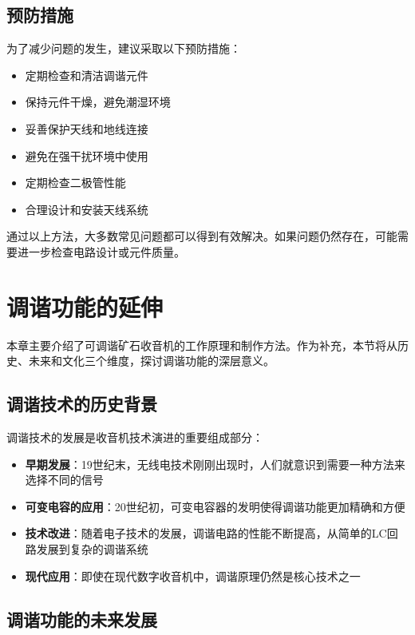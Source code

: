 \documentclass[12pt,UTF8]{ctexbook}
\begin{document}
\subsection{预防措施}

为了减少问题的发生，建议采取以下预防措施：

\begin{itemize}[leftmargin=3.5em]
    \item 定期检查和清洁调谐元件
    \item 保持元件干燥，避免潮湿环境
    \item 妥善保护天线和地线连接
    \item 避免在强干扰环境中使用
    \item 定期检查二极管性能
    \item 合理设计和安装天线系统
\end{itemize}

通过以上方法，大多数常见问题都可以得到有效解决。如果问题仍然存在，可能需要进一步检查电路设计或元件质量。

\section*{调谐功能的延伸}


本章主要介绍了可调谐矿石收音机的工作原理和制作方法。作为补充，本节将从历史、未来和文化三个维度，探讨调谐功能的深层意义。

\subsection{调谐技术的历史背景}

调谐技术的发展是收音机技术演进的重要组成部分：

\begin{itemize}[leftmargin=3.5em]
    \item \textbf{早期发展}：19世纪末，无线电技术刚刚出现时，人们就意识到需要一种方法来选择不同的信号
    \item \textbf{可变电容的应用}：20世纪初，可变电容器的发明使得调谐功能更加精确和方便
    \item \textbf{技术改进}：随着电子技术的发展，调谐电路的性能不断提高，从简单的LC回路发展到复杂的调谐系统
    \item \textbf{现代应用}：即使在现代数字收音机中，调谐原理仍然是核心技术之一
\end{itemize}

\subsection{调谐功能的未来发展}
\end{document}
